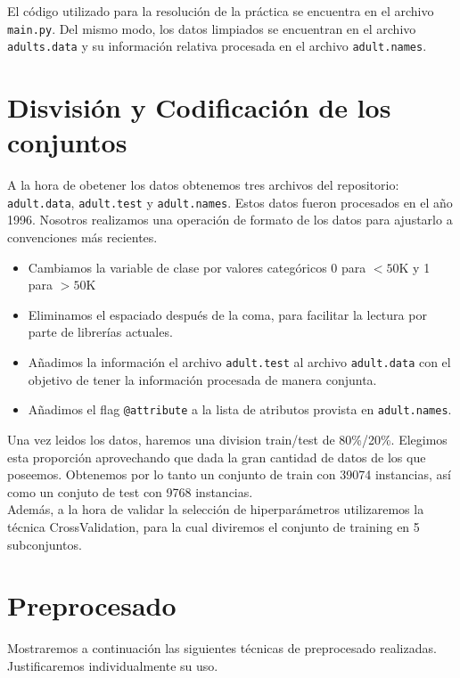 \documentclass[11pt,a4paper]{article}
\begin{document}
El código utilizado para la resolución de la práctica se encuentra en el archivo \texttt{main.py}.  Del mismo modo, los datos limpiados se encuentran en el archivo \texttt{adults.data} y su información relativa procesada en el archivo \texttt{adult.names}.


\section{ Disvisión y Codificación de los conjuntos}

A la hora de obetener los datos obtenemos tres archivos del repositorio: \texttt{adult.data},  \texttt{adult.test} y \texttt{adult.names}. Estos datos fueron procesados en el año 1996. Nosotros realizamos una operación de formato de los datos para ajustarlo a convenciones más recientes.

\begin{itemize}
\item Cambiamos la variable de clase por valores categóricos 0 para $<50$K y 1 para $>50$K

\item Eliminamos el espaciado después de la coma, para facilitar la lectura por parte de librerías actuales.
\item Añadimos la información el archivo \texttt{adult.test} al archivo \texttt{adult.data} con el objetivo de tener la información procesada de manera conjunta.
\item Añadimos el flag \texttt{@attribute} a la lista de atributos provista en \texttt{adult.names}.
\end{itemize}

Una vez leidos los datos, haremos una division train/test de 80\%/20\%. Elegimos esta proporción aprovechando  que dada la gran cantidad de datos de los que poseemos. Obtenemos por lo tanto un conjunto de train con 39074 instancias, así como un conjuto de test con 9768 instancias.\\

Además, a la hora de validar la selección de hiperparámetros utilizaremos la técnica CrossValidation, para la cual diviremos el conjunto de training en 5 subconjuntos.





\section{Preprocesado} 

Mostraremos a continuación las siguientes técnicas de preprocesado realizadas. Justificaremos individualmente su uso.
\end{document}
